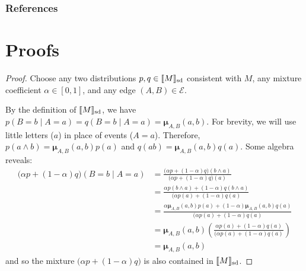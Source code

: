 \documentclass{article}
\newcommand\SD{_{\text{sd}}}
\newcommand{\bmu}{\boldsymbol{\mu}}
\newcommand{\Ed}{\mathcal E}
\numberwithin{equation}{section}
\begin{document}
\begin{notfocus}
	\subsubsection*{References}
	\printbibliography[heading=none]
	
	\onecolumn
	\appendix
	
	\section{Proofs}
	\thmsetconvex*
	\begin{proof}
		Choose any two distributions $p, q \in \bbr{M}\SD$ consistent with $M$, any mixture coefficient $\alpha \in [0,1]$, and any edge $(A,B) \in \Ed$.
		
		By the definition of $\bbr{M}\SD$, we have $p(B = b \mid A = a) = q(B = b \mid A = a) = \bmu_{A,B}(a,b)$.  
		For brevity, we will use little letters ($a$) in place of events ($A = a$).
		Therefore, $p(a\land b) = \bmu_{A,B}(a,b) p(a)$ and $q(ab) = \bmu_{A,B}(a,b) q(a)$. Some algebra reveals:
		\begin{align*}
			\Big( \alpha p + (1-\alpha) q \Big) (B = b \mid A = a) &= 
			\frac{\Big( \alpha p + (1-\alpha) q \Big) (b \land a)}{\Big( \alpha p + (1-\alpha) q \Big) (a)} \\
			&= \frac{ \alpha p(b \land a) + (1-\alpha) q(b \land a) }{\Big( \alpha p(a) + (1-\alpha) q (a)} \\
			&= \frac{ \alpha \bmu_{A,B}(a,b) p(a) + (1-\alpha) \bmu_{A,B}(a,b) q(a) }{\Big( \alpha p(a) + (1-\alpha) q (a)} \\
			&=\bmu_{A,B}(a,b) \left(\frac{ \alpha  p(a) + (1-\alpha) q(a) }{\Big( \alpha p(a) + (1-\alpha) q (a)}\right)\\
			&= \bmu_{A,B}(a,b)
		\end{align*}
		and so the mixture $\Big(\alpha p + (1-\alpha) q \Big)$ is also contained in $\bbr{M}\SD$.
	\end{proof}
	

\end{notfocus}
\end{document}
